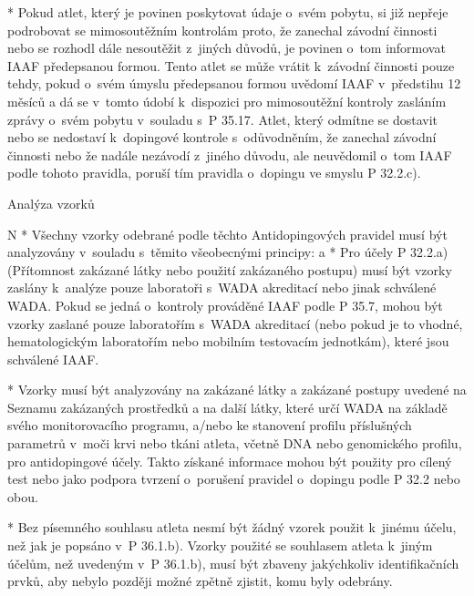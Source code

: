 * Pokud atlet, který je povinen poskytovat údaje o~svém pobytu, si již nepřeje podrobovat se mimosoutěžním kontrolám proto, že zanechal závodní činnosti nebo se rozhodl dále nesoutěžit z~jiných důvodů, je povinen o~tom informovat IAAF předepsanou formou. Tento atlet se může vrátit k~závodní činnosti pouze tehdy, pokud o~svém úmyslu předepsanou formou uvědomí IAAF v~předstihu 12 měsíců a dá se v~tomto údobí k~dispozici pro mimosoutěžní kontroly zasláním zprávy o~svém pobytu v~souladu s~P 35.17. Atlet, který odmítne se dostavit nebo se nedostaví k~dopingové kontrole s~odůvodněním, že zanechal závodní činnosti nebo že nadále nezávodí z~jiného důvodu, ale neuvědomil o~tom IAAF podle tohoto pravidla, poruší tím pravidla o~dopingu ve smyslu P 32.2.c).
\enditems

\secc Analýza vzorků

\begitems \style N
* Všechny vzorky odebrané podle těchto Antidopingových pravidel musí být analyzovány v~souladu s~těmito všeobecnými principy:
  \begitems \style a
  * Pro účely P 32.2.a) (Přítomnost zakázané látky nebo použití zakázaného postupu) musí být vzorky zaslány k~analýze pouze laboratoři s~WADA akreditací nebo jinak schválené WADA. Pokud se jedná o~kontroly prováděné IAAF podle P 35.7, mohou být vzorky zaslané pouze laboratořím s~WADA akreditací (nebo pokud je to vhodné, hematologickým laboratořím nebo mobilním testovacím jednotkám), které jsou schválené IAAF.

  * Vzorky musí být analyzovány na zakázané látky a zakázané postupy uvedené na Seznamu zakázaných prostředků a na další látky, které určí WADA na základě svého monitorovacího programu, a/nebo ke stanovení profilu příslušných parametrů v~moči krvi nebo tkáni atleta, včetně DNA nebo genomického profilu, pro antidopingové účely. Takto získané informace mohou být použity pro cílený test nebo jako podpora tvrzení o~porušení pravidel o~dopingu podle P 32.2 nebo obou.

  * Bez písemného souhlasu atleta nesmí být žádný vzorek použit k~jinému účelu, než jak je popsáno v~P 36.1.b). Vzorky použité se souhlasem atleta k~jiným účelům, než uvedeným v~P 36.1.b), musí být zbaveny jakýchkoliv identifikačních prvků, aby nebylo později možné zpětně zjistit, komu byly odebrány.

